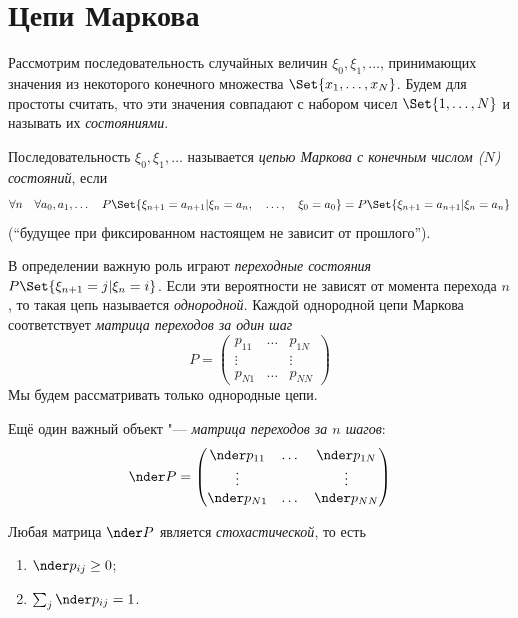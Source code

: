 \chapter{Цепи Маркова}

Рассмотрим последовательность случайных величин $ \xi_0, \xi_1, \dotsc $, принимающих
значения из некоторого конечного множества $ \Set{x_1, \dots, x_N} $.
Будем для простоты считать, что эти значения совпадают с набором чисел $ \Set{1, \dots, N} $ и
называть их \emph{состояниями}.

\begin{definition}
    Последовательность $ \xi_0, \xi_1, \dotsc $ называется \emph{цепью Маркова с конечным числом
    ($ N $) состояний}, если
    $$ \forall n \quad \forall a_0, a_1, \dotsc \quad
    P\Set{\xi_{n + 1} = a_{n + 1} | \xi_n = a_n, \quad \dots, \quad \xi_0 = a_0} =
    P\Set{\xi_{n + 1} = a_{n + 1} | \xi_n = a_n} $$
    (``будущее при фиксированном настоящем не зависит от прошлого'').
\end{definition}

В определении важную роль играют \emph{переходные состояния} $ P\Set{\xi_{n + 1} = j | \xi_n = i} $.
Если эти вероятности не зависят от момента перехода $ n $, то такая цепь называется
\emph{однородной}.
Каждой однородной цепи Маркова соответствует \emph{матрица переходов за один шаг}
$$ P =
\begin{pmatrix}
    p_{11} & \dots & p_{1N} \\
    \vdots & & \vdots \\
    p_{N1} & \dots & p_{NN}
\end{pmatrix} $$
Мы будем рассматривать только однородные цепи.

Ещё один важный объект "--- \emph{матрица переходов за $ n $ шагов}:
$$ \nder P =
\begin{pmatrix}
    \nder p_{11} & \dots & \nder p_{1N} \\
    \vdots & & \vdots \\
    \nder p_{N1} & \dots & \nder p_{NN}
\end{pmatrix} $$

\begin{remark}
    Любая матрица $ \nder P $ является \emph{стохастической}, то есть
    \begin{enumerate}
        \item $ \nder p_{ij} \ge 0 $;
        \item $ \sum_j \nder p_{ij} = 1 $.
    \end{enumerate}
\end{remark}

